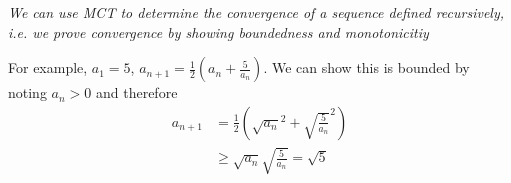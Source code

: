 \begin{example}
    \textit{We can use MCT to determine the convergence
    of a sequence defined recursively,
    i.e. we prove convergence by showing
    boundedness and monotonicitiy}
    \medskip

    For example, $a_1 = 5$, $a_{n + 1} = \frac{1}{2} \left( a_n + \frac{5}{a_n} \right) $.
    We can show this is bounded by noting $a_n > 0$ and 
    therefore 
    \begin{align*}
        a_{n + 1} &= \frac{1}{2} \left( 
            \sqrt{a_n}^2 + \sqrt{ \frac{5}{a_n}}^2
        \right)  \\
        & \geq \sqrt{a_n} \sqrt{ \frac{5}{a_n}}
        = \sqrt{5}
    \end{align*}
\end{example}



